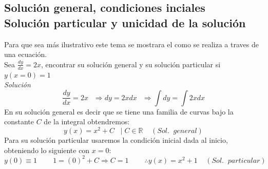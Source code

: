 \documentclass[10pt,executivepaper]{article}
\begin{document}
\subsection{Solución general, condiciones inciales\\Solución particular y unicidad de la solución}
Para que sea más ilustrativo este tema se mostrara el como se realiza a traves de una ecuación.\\
Sea $\frac{dy}{dx}=2x$, encontrar su solución general y su solución particular si $y(x=0)=1$
\\\textit{Solución}
\[\frac{dy}{dx}=2x\:\:\;\Rightarrow dy=2xdx\:\:\;\Rightarrow \int dy=\int 2xdx\]
En su solución general es decir que se tiene una familia de curvas bajo la constante $C$ de la integral obtendremos:
\[y(x)=x^{2}+C\;\;\;|\;C \in \mathbb{R}\;\;\;\;(Sol.\;\;general)\]
Para su solución particular usaremos la condición inicial dada al inicio, obteniendo lo siguiente con $x=0$:
\[y(0)\equiv 1 \;\;\;\;\;\;\;\;1=(0)^{2}+C \Rightarrow C=1\;\;\;\;\;\;\;\;\therefore y(x)=x^{2}+1\;\;\;\;(Sol.\;\;particular)\]
\end{document}
